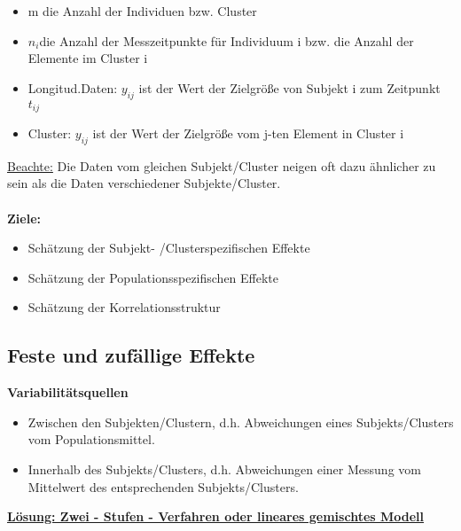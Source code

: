 \begin{itemize}
	\item m die Anzahl der Individuen bzw. Cluster
	\item $n_i$die Anzahl der Messzeitpunkte für Individuum i bzw. die Anzahl der Elemente im Cluster i
	\item Longitud.Daten: $y_{ij}$ ist der Wert der Zielgröße von Subjekt i zum Zeitpunkt $t_{ij}$
	\item Cluster: $y_{ij}$ ist der Wert der Zielgröße vom j-ten Element in Cluster i
\end{itemize}

\underline{Beachte:} Die Daten vom gleichen Subjekt/Cluster neigen oft dazu ähnlicher zu sein als die Daten verschiedener Subjekte/Cluster.
\\\\
\textbf{Ziele:}
\begin{itemize}
	\item Schätzung der Subjekt- /Clusterspezifischen Effekte
	\item Schätzung der Populationsspezifischen Effekte
	\item Schätzung der Korrelationsstruktur
\end{itemize}

\subsection{Feste und zufällige Effekte}
\textbf{Variabilitätsquellen}
\begin{itemize}
	\item Zwischen den Subjekten/Clustern, d.h. Abweichungen eines Subjekts/Clusters vom Populationsmittel.
	\item Innerhalb des Subjekts/Clusters, d.h. Abweichungen einer Messung vom Mittelwert des entsprechenden Subjekts/Clusters.
\end{itemize}

\textbf{\underline{Lösung: Zwei - Stufen - Verfahren oder lineares gemischtes Modell}}


